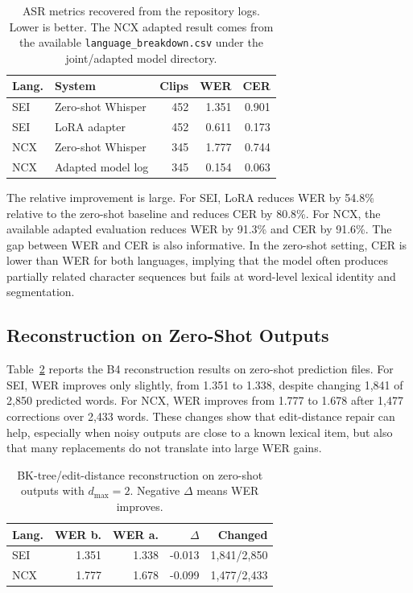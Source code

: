 \documentclass[11pt]{article}
\begin{document}
\begin{table}[t]
\centering
\small
\begin{tabular}{llrrr}
\toprule
Lang. & System & Clips & WER & CER\\
\midrule
SEI & Zero-shot Whisper & 452 & 1.351 & 0.901\\
SEI & LoRA adapter & 452 & 0.611 & 0.173\\
NCX & Zero-shot Whisper & 345 & 1.777 & 0.744\\
NCX & Adapted model log & 345 & 0.154 & 0.063\\
\bottomrule
\end{tabular}
\caption{ASR metrics recovered from the repository logs. Lower is better. The NCX adapted result comes from the available \texttt{language\_breakdown.csv} under the joint/adapted model directory.}
\label{tab:asr}
\end{table}

The relative improvement is large. For SEI, LoRA reduces WER by 54.8\% relative to the zero-shot baseline and reduces CER by 80.8\%. For NCX, the available adapted evaluation reduces WER by 91.3\% and CER by 91.6\%. The gap between WER and CER is also informative. In the zero-shot setting, CER is lower than WER for both languages, implying that the model often produces partially related character sequences but fails at word-level lexical identity and segmentation.

\subsection{Reconstruction on Zero-Shot Outputs}

Table~\ref{tab:recon} reports the B4 reconstruction results on zero-shot prediction files. For SEI, WER improves only slightly, from 1.351 to 1.338, despite changing 1,841 of 2,850 predicted words. For NCX, WER improves from 1.777 to 1.678 after 1,477 corrections over 2,433 words. These changes show that edit-distance repair can help, especially when noisy outputs are close to a known lexical item, but also that many replacements do not translate into large WER gains.

\begin{table}[t]
\centering
\scriptsize
\begin{tabular}{lrrrr}
\toprule
Lang. & WER b. & WER a. & $\Delta$ & Changed\\
\midrule
SEI & 1.351 & 1.338 & -0.013 & 1,841/2,850\\
NCX & 1.777 & 1.678 & -0.099 & 1,477/2,433\\
\bottomrule
\end{tabular}
\caption{BK-tree/edit-distance reconstruction on zero-shot outputs with $d_{\max}=2$. Negative $\Delta$ means WER improves.}
\label{tab:recon}
\end{table}
\end{document}
